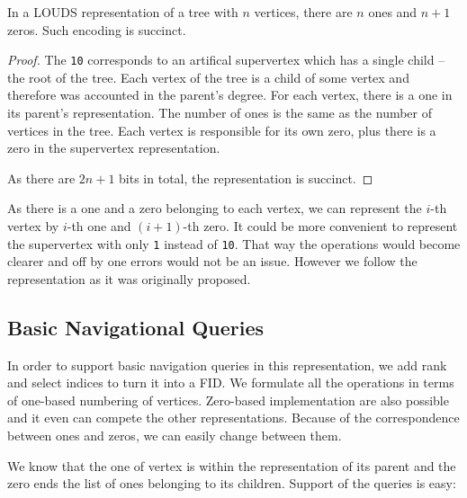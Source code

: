 \begin{lemma}
	In a LOUDS representation of a tree with $n$ vertices, there are $n$ ones and $n+1$ zeros.
	Such encoding is succinct.
\end{lemma}
\begin{proof}
	The \verb|10| corresponds to an artifical supervertex which has a single child -- the root of the tree.
	Each vertex of the tree is a child of some vertex and therefore was accounted in the parent's degree.
	For each vertex, there is a one in its parent's representation.
	The number of ones is the same as the number of vertices in the tree.
	Each vertex is responsible for its own zero, plus there is a zero in the supervertex representation.
	
	As there are $2n+1$ bits in total, the representation is succinct.
\end{proof}

As there is a one and a zero belonging to each vertex, we can represent the $i$-th vertex by $i$-th one and $(i+1)$-th zero.
It could be more convenient to represent the supervertex with only \verb|1| instead of \verb|10|.
That way the operations would become clearer and off by one errors would not be an issue.
However we follow the representation as it was originally proposed.

\subsection{Basic Navigational Queries}

In order to support basic navigation queries in this representation, we add rank and select indices to turn it into a FID.
We formulate all the operations in terms of one-based numbering of vertices.
Zero-based implementation are also possible  and it even can compete the other representations.
Because of the correspondence between ones and zeros, we can easily change between them.

\begin{algorithmic}
	\State {}
\EndFunction
\end{algorithmic}

\begin{algorithmic}
	\State {}
\EndFunction
\end{algorithmic}

We know that the one of vertex is within the representation of its parent and the zero ends the list of ones belonging to its children.
Support of the queries is easy:

